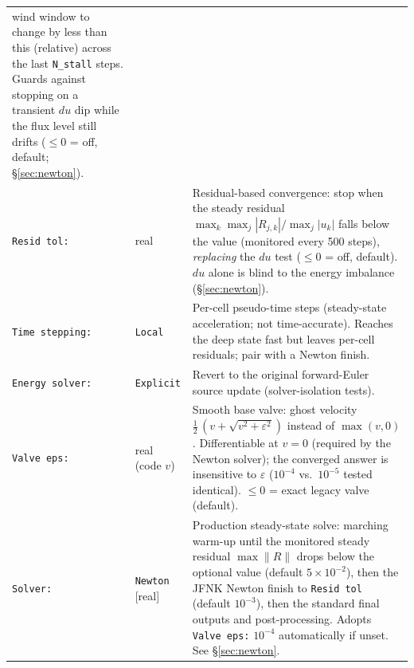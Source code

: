 \documentclass[english,a4paper]{kiseon_memo}
\begin{document}
\begin{longtable}{@{}p{}p{}p{}@{}}
  wind window to change by less than this (relative) across the last
  \texttt{N\_stall} steps. Guards against stopping on a transient $du$ dip while
  the flux level still drifts ($\le0$ = off, default; \S\ref{sec:newton}). \\
\texttt{Resid tol:} & real & Residual-based convergence: stop when the steady
  residual $\max_k\max_j |R_{j,k}|/\max_j|u_k|$ falls below the value (monitored
  every 500 steps), \emph{replacing} the $du$ test ($\le0$ = off, default).
  $du$ alone is blind to the energy imbalance (\S\ref{sec:newton}). \\
\texttt{Time stepping:} & \texttt{Local} & Per-cell pseudo-time steps
  (steady-state acceleration; not time-accurate). Reaches the deep state fast but
  leaves per-cell residuals; pair with a Newton finish. \\
\texttt{Energy solver:} & \texttt{Explicit} & Revert to the original
  forward-Euler source update (solver-isolation tests). \\
\texttt{Valve eps:} & real (code $v$) & Smooth base valve: ghost velocity
  $\tfrac12\,(v+\sqrt{v^2+\varepsilon^2})$ instead of $\max(v,0)$.
  Differentiable at $v=0$ (required by the Newton solver); the converged answer
  is insensitive to $\varepsilon$ ($10^{-4}$ vs.\ $10^{-5}$ tested identical).
  $\le0$ = exact legacy valve (default). \\
\texttt{Solver:} & \texttt{Newton} [real] & Production steady-state solve:
  marching warm-up until the monitored steady residual $\max\|R\|$ drops below
  the optional value (default $5\times10^{-2}$), then the JFNK Newton finish to
  \texttt{Resid tol} (default $10^{-3}$), then the standard final outputs and
  post-processing. Adopts \texttt{Valve eps:} $10^{-4}$ automatically if unset.
  See \S\ref{sec:newton}. \\
\end{longtable}
\end{document}
